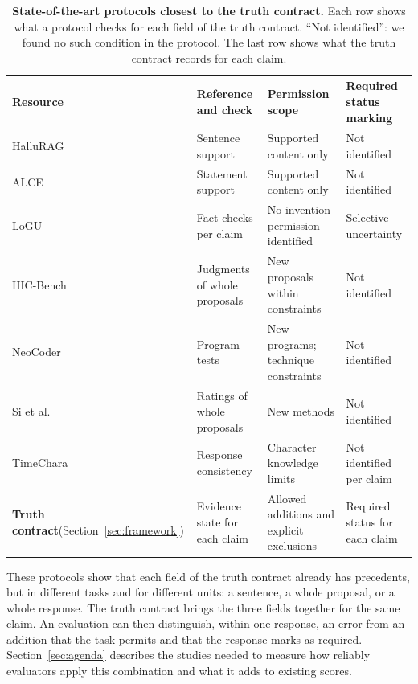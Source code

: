 \documentclass{clv2025}
\begin{document}
\begin{table}[!ht]
\centering\small
\caption{\textbf{State-of-the-art protocols closest to the truth contract.}
Each row shows what a protocol checks for each field of the truth contract.
``Not identified'': we found no such condition in the protocol. The last
row shows what the truth contract records for each claim.}
\label{tab:precedents}
\begin{tabularx}{\linewidth}{@{}P{.17\linewidth}YYY@{}}
\toprule
\textbf{Resource} & \textbf{Reference and check} & \textbf{Permission scope} & \textbf{Required status marking}\\\midrule
HalluRAG & Sentence support & Supported content only & Not identified\\\addlinespace[4pt]
ALCE & Statement support & Supported content only & Not identified\\\addlinespace[4pt]
LoGU & Fact checks per claim & No invention permission identified & Selective uncertainty\\\addlinespace[4pt]
HIC-Bench & Judgments of whole proposals & New proposals within constraints & Not identified\\\addlinespace[4pt]
NeoCoder & Program tests & New programs; technique constraints & Not identified\\\addlinespace[4pt]
Si et al. & Ratings of whole proposals & New methods & Not identified\\\addlinespace[4pt]
TimeChara & Response consistency & Character knowledge limits & Not identified per claim\\\midrule
{}
\textbf{Truth contract}\newline(Section~\ref{sec:framework}) & Evidence state for each claim & Allowed additions and explicit exclusions & Required status for each claim\\
\bottomrule
\end{tabularx}


\end{table}

These protocols show that each field of the truth contract already has
precedents, but in different tasks and for different units: a sentence, a
whole proposal, or a whole response. The truth contract brings the three
fields together for the same claim. An evaluation can then distinguish,
within one response, an error from an addition that the task permits and
that the response marks as required. Section~\ref{sec:agenda} describes
the studies needed to measure how reliably evaluators apply this
combination and what it adds to existing scores.
\end{document}
